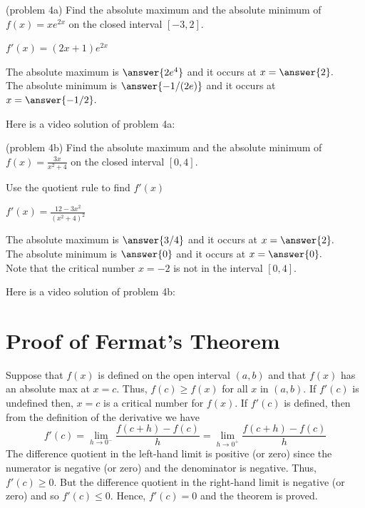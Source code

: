 \documentclass[handout]{ximera}
\begin{document}
\begin{problem}(problem 4a)
Find the absolute maximum and the absolute minimum of $f(x) = xe^{2x}$
on the closed interval $[-3, 2]$.
\begin{hint}
$f'(x) = (2x+1)e^{2x}$
\end{hint}

The absolute maximum is $\answer{2e^4}$ and it occurs at $x = \answer{2}.$\\
The absolute minimum is $\answer{-1/(2e)}$ and it occurs at $x = \answer{-1/2}.$ 
\end{problem}

Here is a video solution of  problem 4a:
\begin{foldable}
\end{foldable}

\begin{problem}(problem 4b)
Find the absolute maximum and the absolute minimum of $f(x) = \frac{3x}{x^2+4}$
on the closed interval $[0, 4]$.

\begin{hint}
Use the quotient rule to find $f'(x)$
\end{hint}
\begin{hint}
$f'(x) = \frac{12-3x^2}{(x^2+4)^2}$
\end{hint}

The absolute maximum is $\answer{3/4}$ and it occurs at $x = \answer{2}.$\\
The absolute minimum is $\answer{0}$ and it occurs at $x = \answer{0}.$\\
Note that the critical number $x= -2$ is not in the interval $[0, 4]$. 
\end{problem}

Here is a video solution of  problem 4b:
\begin{foldable}
\end{foldable}

\begin{center}
\begin{foldable}
\end{foldable}
\end{center}


\section{Proof of Fermat's Theorem}
Suppose that $f(x)$ is defined on the open interval $(a,b)$ and that $f(x)$ has an absolute max at $x=c$.
Thus, $f(c) \geq f(x)$ for all $x$ in $(a,b)$. If $f'(c)$ is undefined then, $x=c$ is a critical number for $f(x)$.
If $f'(c)$ is defined, then from the definition of the derivative we have
\[
f'(c) = \lim_{h \to 0^-} \frac{f(c+h) -f(c)}{h} = \lim_{h \to 0^+} \frac{f(c+h) -f(c)}{h}
\]
The difference quotient in the left-hand limit is positive (or zero) since the numerator is negative (or zero) and the denominator is negative.
Thus, $f'(c) \geq 0$.  But the difference quotient in the right-hand limit is negative (or zero) and so $f'(c) \leq 0$.
Hence, $f'(c) = 0$ and the theorem is proved.
\end{document}
